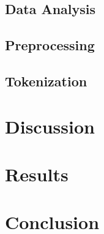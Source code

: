 \documentclass[12pt]{article}
\begin{document}
\subsection{Data Analysis}
\subsection{Preprocessing}
\subsection{Tokenization}
\section{Discussion}
\section{Results}
\section{Conclusion}

\newpage


\end{document}
